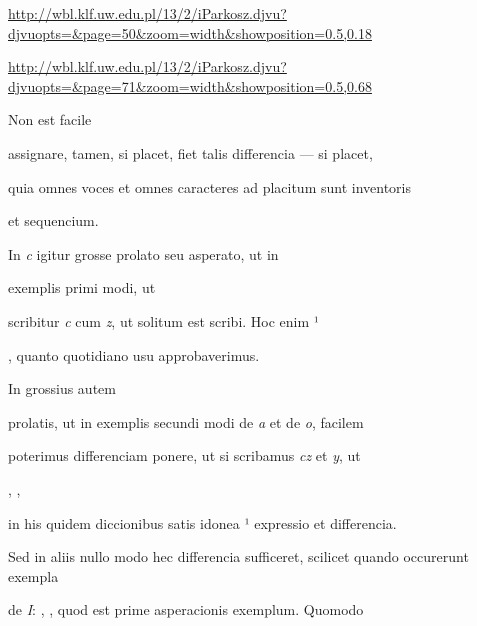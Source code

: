 
{
\url{http://wbl.klf.uw.edu.pl/13/2/iParkosz.djvu?djvuopts=&page=50&zoom=width&showposition=0.5,0.18}

\url{http://wbl.klf.uw.edu.pl/13/2/iParkosz.djvu?djvuopts=&page=71&zoom=width&showposition=0.5,0.68}
}

\bigskip

\obeylines
\mono


\fullpreviouslines


{
\color{blue}
Non est facile 

assignare, tamen, si placet, fiet talis differencia — si placet,

}


\fulllines
quia omnes voces et omnes caracteres ad placitum sunt inventoris

\splitlines
et sequencium.

\indentK In \textit{c} igitur grosse prolato seu asperato, ut in

\fulllines

exemplis primi modi, ut     

scribitur \textit{c} cum \textit{z}, ut solitum est scribi. Hoc enim ¹ 

\splitlines

, quanto quotidiano usu approbaverimus.

\indentK In grossius autem

\fulllines

prolatis, ut in exemplis secundi modi de \textit{a} et de \textit{o}, facilem

poterimus differenciam ponere, ut si scribamus \textit{cz} et \textit{y}, ut 

,     ,

in his quidem diccionibus satis idonea ¹ expressio et differencia.

Sed in aliis nullo modo hec differencia sufficeret, scilicet quando occurerunt exempla

de \textit{I}: , , quod est prime asperacionis exemplum. Quomodo

